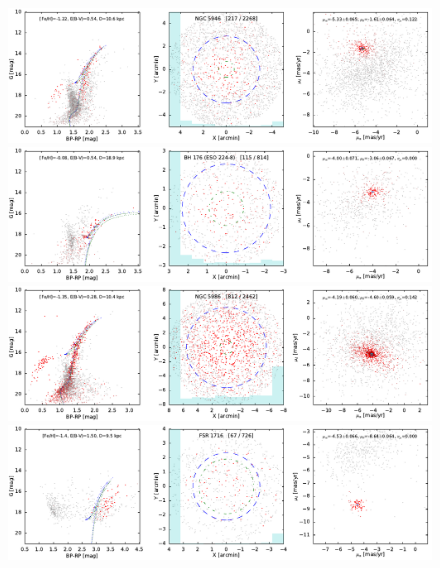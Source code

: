 \documentclass[usenatbib]{mnras}
\begin{document}
\clearpage\begin{figure}
\contcaption{}
\includegraphics{figs/NGC_5946.pdf}
\includegraphics{figs/BH_176.pdf}
\includegraphics{figs/NGC_5986.pdf}
\includegraphics{figs/FSR_1716.pdf}
\end{figure}
\end{document}
